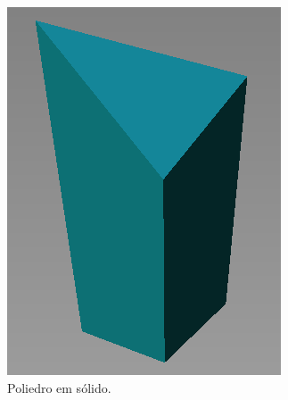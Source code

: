 \begin{figure}[H]
\begin{subfigure}[t]{0.25\textwidth}
        \includegraphics[width=\textwidth]{dados/figuras/pol_solid.png}
        \caption{Poliedro em sólido.}
        \label{fig:polyhedron2}
    \end{subfigure}
    \hspace{2em}
    \begin{subfigure}[t]{0.25\textwidth}

\end{subfigure}
\end{figure}
